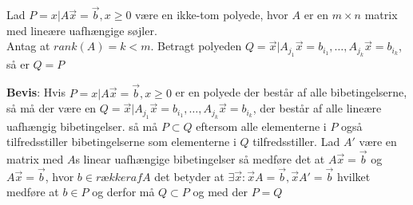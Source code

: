 \begin{stn}
Lad $P=x|A\vec{x}=\vec{b},x\geq 0$ være en ikke-tom polyede, hvor $A$ er en $m\times n$ matrix med lineære uafhængige søjler.\\
Antag at $rank(A)=k<m$. Betragt polyeden $Q=\vec{x}|A_{j_1}\vec{x}=b_{i_1},\dots ,A_{j_k}\vec{x}=b_{i_k}$, så er $Q=P$
\end{stn}
\textbf{Bevis}:
Hvis $P=x|A\vec{x}=\vec{b},x\geq 0$ er en polyede der består af alle bibetingelserne, så må der være en $Q=\vec{x}|A_{j_1}\vec{x}=b_{i_1},\dots ,A_{j_k}\vec{x}=b_{i_k}$, der består af alle lineære uafhængig bibetingelser. så må $P\subset Q$ eftersom alle elementerne i $P$ også tilfredsstiller bibetingelserne som elementerne i $Q$ tilfredsstiller.
Lad $A'$ være en matrix med $A$s linear uafhængige bibetingelser så medføre det at $A\vec{x}=\vec{b}$ og $A\vec{x}=\vec{b}$, hvor $b\in {rækker af A}$ det betyder at $\exists \vec{x}:\vec{x}A=\vec{b}, \vec{x}A'=\vec{b}$ hvilket medføre at $b\in P$ og derfor må $Q\subset P$ og med der $P=Q$
